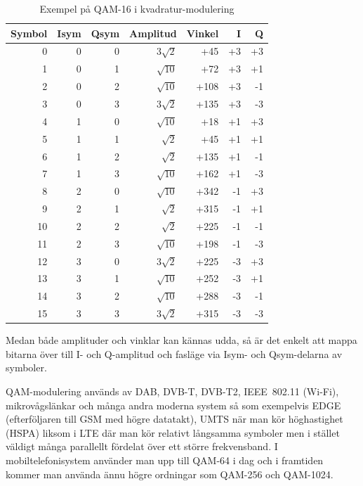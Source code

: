 \begin{table}[ht]
\begin{center}
\begin{tabular}{|r|r|r|r|r|r|r|}
\hline
Symbol & Isym & Qsym & Amplitud      & Vinkel &  I &   Q \\ \hline
     0 &    0 &    0 & \(3\sqrt{2}\) &    +45 & +3 &  +3 \\
     1 &    0 &    1 & \(\sqrt{10}\) &    +72 & +3 &  +1 \\
     2 &    0 &    2 & \(\sqrt{10}\) &   +108 & +3 &  -1 \\
     3 &    0 &    3 & \(3\sqrt{2}\) &   +135 & +3 &  -3 \\
     4 &    1 &    0 & \(\sqrt{10}\) &    +18 & +1 &  +3 \\
     5 &    1 &    1 &  \(\sqrt{2}\) &    +45 & +1 &  +1 \\
     6 &    1 &    2 &  \(\sqrt{2}\) &   +135 & +1 &  -1 \\
     7 &    1 &    3 & \(\sqrt{10}\) &   +162 & +1 &  -3 \\
     8 &    2 &    0 & \(\sqrt{10}\) &   +342 & -1 &  +3 \\
     9 &    2 &    1 &  \(\sqrt{2}\) &   +315 & -1 &  +1 \\
    10 &    2 &    2 &  \(\sqrt{2}\) &   +225 & -1 &  -1 \\
    11 &    2 &    3 & \(\sqrt{10}\) &   +198 & -1 &  -3 \\
    12 &    3 &    0 & \(3\sqrt{2}\) &   +225 & -3 &  +3 \\
    13 &    3 &    1 & \(\sqrt{10}\) &   +252 & -3 &  +1 \\
    14 &    3 &    2 & \(\sqrt{10}\) &   +288 & -3 &  -1 \\
    15 &    3 &    3 & \(3\sqrt{2}\) &   +315 & -3 &  -3 \\ \hline
\end{tabular}
\end{center}
\caption{Exempel på QAM-16 i kvadratur-modulering}
\label{tab:QAM-16}
\end{table}

Medan både amplituder och vinklar kan kännas udda, så är det enkelt
att mappa bitarna över till I- och Q-amplitud och fasläge via Isym- och
Qsym-delarna av symboler.

QAM-modulering används av DAB, DVB-T, DVB-T2, IEEE~802.11 (Wi-Fi),
mikrovågslänkar och många andra moderna system så som exempelvis EDGE
(efterföljaren till GSM med högre datatakt), UMTS när man kör
höghastighet (HSPA) liksom i LTE där man kör relativt långsamma
symboler men i stället väldigt många parallellt fördelat över ett
större frekvensband. I mobiltelefonisystem använder man upp till
QAM-64 i dag och i framtiden kommer man använda ännu högre ordningar 
som QAM-256 och QAM-1024.

